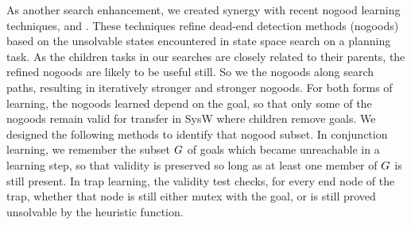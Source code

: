 As another search enhancement, we created synergy with recent nogood
learning techniques, 
\cite{steinmetz:hoffmann:ai-17} and 
\cite{steinmetz:hoffmann:ijcai-17}. These techniques refine dead-end
detection methods (nogoods) based on the unsolvable states encountered
in state space search on a planning task. As the children tasks in our
searches are closely related to their parents, the refined nogoods are
likely to be useful still. So we  the nogoods along
search paths, resulting in iteratively stronger and stronger
nogoods. For both forms of learning, the nogoods learned depend on the
goal, so that only some of the nogoods remain valid for transfer in
SysW where children remove goals. We designed the following methods to
identify that nogood subset. In conjunction learning, we remember the
subset $G$ of goals which became unreachable in a learning step,
so that validity is preserved so long as at least one member of
$G$ is still present. In trap learning, the validity test checks,
for every end node of the trap, whether that node is still either
mutex with the goal, or is still proved unsolvable by the heuristic
function.

%

